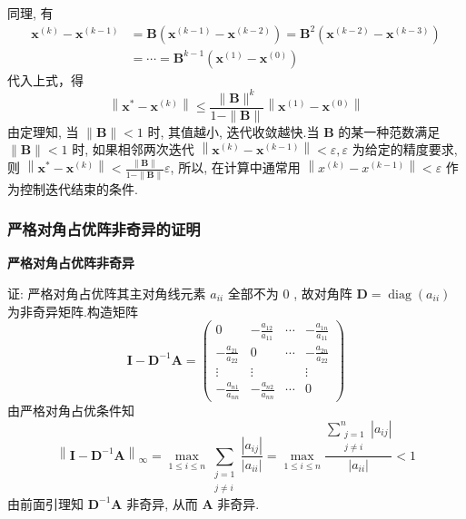 同理, 有
$$
\begin{aligned}
\boldsymbol{x}^{(k)}-\boldsymbol{x}^{(k-1)} & =\boldsymbol{B}\left(\boldsymbol{x}^{(k-1)}-\boldsymbol{x}^{(k-2)}\right)=\boldsymbol{B}^{2}\left(\boldsymbol{x}^{(k-2)}-\boldsymbol{x}^{(k-3)}\right) \\
& =\cdots=\boldsymbol{B}^{k-1}\left(\boldsymbol{x}^{(1)}-\boldsymbol{x}^{(0)}\right)
\end{aligned}
$$
代入上式，得
$$
\left\|\boldsymbol{x}^{*}-\boldsymbol{x}^{(k)}\right\| \leqslant \frac{\|\boldsymbol{B}\|^{k}}{1-\|\boldsymbol{B}\|}\left\|\boldsymbol{x}^{(1)}-\boldsymbol{x}^{(0)}\right\|
$$
由定理知, 当 $ \|\boldsymbol{B}\|<1 $ 时, 其值越小, 迭代收敛越快.当 $ \boldsymbol{B} $ 的某一种范数满足 $ \|\boldsymbol{B}\|<1 $ 时, 如果相邻两次迭代 $ \left\|\boldsymbol{x}^{(k)}-\boldsymbol{x}^{(k-1)}\right\|<\varepsilon, \varepsilon $ 为给定的精度要求, 则 $ \left\|\boldsymbol{x}^{*}-\boldsymbol{x}^{(k)}\right\|<\frac{\|\boldsymbol{B}\|}{1-\|\boldsymbol{B}\|} \varepsilon $, 所以, 在计算中通常用 $ \left\|x^{(k)}-x^{(k-1)}\right\|<\varepsilon $ 作为控制迭代结束的条件.

\subsubsection{严格对角占优阵非奇异的证明}
\textbf{严格对角占优阵非奇异}

证: 严格对角占优阵其主对角线元素 $ a_{i i} $ 全部不为 0 , 故对角阵 $ \boldsymbol{D}=\operatorname{diag}\left(a_{i i}\right) $ 为非奇异矩阵.构造矩阵
$$
\boldsymbol{I}-\boldsymbol{D}^{-1} \boldsymbol{A}=\left(\begin{array}{cccc}
0 & -\frac{a_{12}}{a_{11}} & \cdots & -\frac{a_{1 n}}{a_{11}} \\
-\frac{a_{21}}{a_{22}} & 0 & \cdots & -\frac{a_{2 n}}{a_{22}} \\
\vdots & \vdots & & \vdots \\
-\frac{a_{n 1}}{a_{n n}} & -\frac{a_{n 2}}{a_{n n}} & \cdots & 0
\end{array}\right)
$$
由严格对角占优条件知
$$
\left\|\boldsymbol{I}-\boldsymbol{D}^{-1} \boldsymbol{A}\right\|_{\infty}=\max _{1 \leqslant i \leqslant n} \sum_{\substack{j=1 \\ j \neq i}} \frac{\left|a_{i j}\right|}{\left|a_{i i}\right|}=\max _{1 \leqslant i \leqslant n} \frac{\sum_{\substack{j=1 \\ j \neq i}}^{n}\left|a_{i j}\right|}{\left|a_{i i}\right|}<1
$$
由前面引理知 $ \boldsymbol{D}^{-1} \boldsymbol{A} $ 非奇异, 从而 $ \boldsymbol{A} $ 非奇异.

